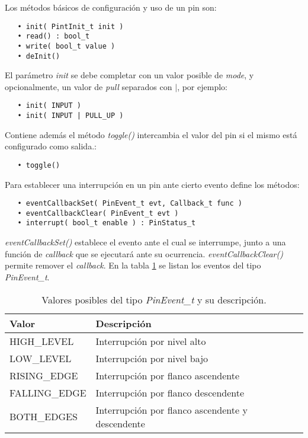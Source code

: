 
Los métodos básicos de configuración y uso de un pin son:

\begin{verbatim}
   • init( PintInit_t init )
   • read() : bool_t
   • write( bool_t value )
   • deInit()
\end{verbatim}


El parámetro \emph{init} se debe completar con un valor posible de \emph{mode}, y opcionalmente, un valor de \emph{pull} separados con $|$, por ejemplo:

\begin{verbatim}
   • init( INPUT )
   • init( INPUT | PULL_UP )
\end{verbatim}

Contiene además el método \emph{toggle()} intercambia el valor del pin si el mismo está configurado como salida.:

\begin{verbatim}
   • toggle()
\end{verbatim}

Para establecer una interrupción en un pin ante cierto evento define los métodos: 

\begin{verbatim}
   • eventCallbackSet( PinEvent_t evt, Callback_t func )
   • eventCallbackClear( PinEvent_t evt )
   • interrupt( bool_t enable ) : PinStatus_t
 \end{verbatim} 

\emph{eventCallbackSet()} establece el evento ante el cual se interrumpe, junto a una función de \emph{callback} que se ejecutará ante su ocurrencia. \emph{eventCallbackClear()} permite remover el \emph{callback}. En la tabla \ref{tab:PinEvtT} se listan los eventos del tipo \emph{PinEvent\_t}.

\begin{table}[h]
	\centering	
	\begin{tabular}{l l}   
		\toprule
		\textbf{Valor} & \textbf{Descripción} \\
		\midrule
		HIGH\_LEVEL  & Interrupción por nivel alto \\		
		LOW\_LEVEL   & Interrupción por nivel bajo \\
		RISING\_EDGE & Interrupción por flanco ascendente \\
		FALLING\_EDGE & Interrupción por flanco descendente \\
		BOTH\_EDGES & Interrupción por flanco ascendente y descendente \\
		\bottomrule
		\hline
	\end{tabular}
	\caption[Valores posibles del tipo \emph{PinEvent\_t}.]{Valores posibles del tipo \emph{PinEvent\_t} y su descripción.}
	\label{tab:PinEvtT}
\end{table}

